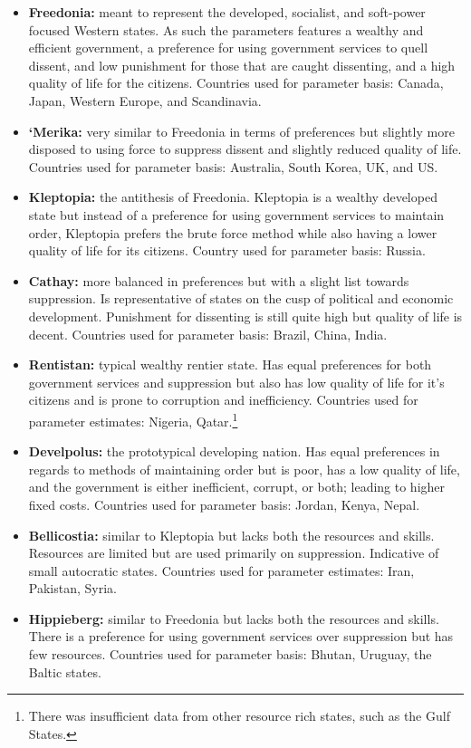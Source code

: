 \documentclass[12pt]{article}
\begin{document}
\begin{spacing}{1.5}
\begin{itemize}
	\item \textbf{Freedonia:} meant to represent the developed, socialist, and soft-power focused Western states. As such the parameters features a wealthy and efficient government, a preference for using government services to quell dissent, and low punishment for those that are caught dissenting, and a high quality of life for the citizens. Countries used for parameter basis: Canada, Japan, Western Europe, and Scandinavia. 
	\item \textbf{`Merika:} very similar to Freedonia in terms of preferences but slightly more disposed to using force to suppress dissent and slightly reduced quality of life.  Countries used for parameter basis: Australia, South Korea, UK, and US. 
	\item \textbf{Kleptopia:} the antithesis of Freedonia. Kleptopia is a wealthy developed state but instead of a preference for using government services to maintain order, Kleptopia prefers the brute force method while also having a lower quality of life for its citizens.  Country used for parameter basis: Russia.  
	\item \textbf{Cathay:} more balanced in preferences but with a slight list towards suppression. Is representative of states on the cusp of political and economic development. Punishment for dissenting is still quite high but quality of life is decent.  Countries used for parameter basis: Brazil, China, India.   
	\item \textbf{Rentistan:} typical wealthy rentier state. Has equal preferences for both government services and suppression but also has low quality of life for it's citizens and is prone to corruption and inefficiency.  Countries used for parameter estimates: Nigeria, Qatar.\footnote{There was insufficient data from other resource rich states, such as the Gulf States.} 
	\item \textbf{Develpolus:} the prototypical developing nation. Has equal preferences in regards to methods of maintaining order but is poor, has a low quality of life, and the government is either inefficient, corrupt, or both; leading to higher fixed costs. Countries used for parameter basis: Jordan, Kenya, Nepal.  	
	\item \textbf{Bellicostia:} similar to Kleptopia but lacks both the resources and skills. Resources are limited but are used primarily on suppression. Indicative of small autocratic states.  Countries used for parameter estimates: Iran, Pakistan, Syria. 
	\item \textbf{Hippieberg:} similar to Freedonia but lacks both the resources and skills. There is a preference for using government services over suppression but has few resources. Countries used for parameter basis: Bhutan, Uruguay, the Baltic states.  
\end{itemize}



\end{spacing}
\end{document}
